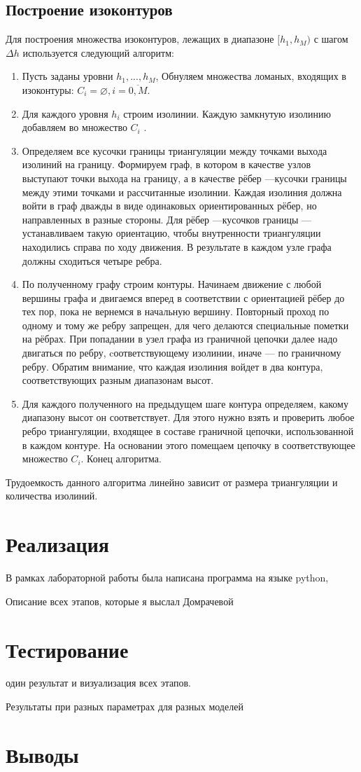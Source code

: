 \documentclass[12pt,a4paper,oneside]{extarticle}
\begin{document}
    \subsection{Построение изоконтуров}
        Для построения множества изоконтуров, лежащих в диапазоне $[h_1, h_M)$ с шагом $\Delta h$ используется следующий алгоритм:
         \begin{enumerate}
            \item Пусть заданы уровни $h_1 ,..., h_M$, Обнуляем множества ломаных, входящих в изоконтуры: $C_i = \varnothing, i = \overline{0, M}$.
            \item Для каждого уровня $h_i$ строим изолинии. Каждую замкнутую изолинию добавляем во множество $C_i$ .
            \item Определяем все кусочки границы триангуляции между точками выхода изолиний на границу. Формируем граф, в котором в качестве узлов выступают точки выхода на границу, а в качестве рёбер ---кусочки границы между этими точками и рассчитанные изолинии. Каждая изолиния должна войти в граф дважды в виде одинаковых ориентированных рёбер, но направленных в разные стороны. Для рёбер ---кусочков границы --- устанавливаем такую ориентацию, чтобы внутренности триангуляции находились справа по ходу движения. В результате в каждом узле графа должны сходиться четыре ребра.
            \item По полученному графу строим контуры. Начинаем движение с любой вершины графа и двигаемся вперед в соответствии с ориентацией рёбер до тех пор, пока не вернемся в начальную вершину. Повторный проход по одному и тому же ребру запрещен, для чего делаются специальные пометки на рёбрах. При попадании в узел графа из граничной цепочки далее надо двигаться по ребру, cоответствующему изолинии, иначе --- по граничному ребру. Обратим внимание, что каждая изолиния войдет в два контура, соответствующих разным диапазонам высот.
            \item Для каждого полученного на предыдущем шаге контура определяем, какому диапазону высот он соответствует. Для этого нужно взять и проверить любое ребро триангуляции, входящее в составе граничной цепочки, использованной в каждом контуре. На основании этого помещаем цепочку в соответствующее множество $C_i$. Конец алгоритма.
        \end{enumerate}

        Трудоемкость данного алгоритма линейно зависит от размера триангуляции и количества изолиний.
        
\section{Реализация}
    В рамках лабораторной работы была написана программа на языке python, 

    Описание всех этапов, которые я выслал Домрачевой

\section{Тестирование}
    один результат и визуализация всех этапов.

    Результаты при разных параметрах для разных моделей



\section{Выводы}
    
    
\end{document}
